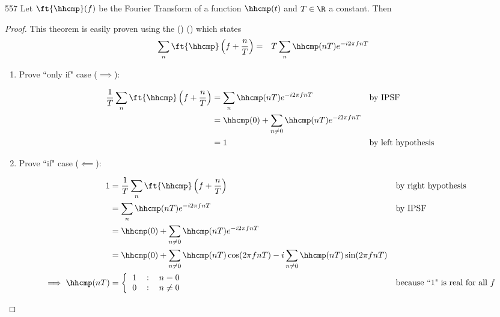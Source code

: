 \begin{theorem}
\citep{proakis}{557}
\label{thm:unity}
Let $\ft{\hhcmp}(f)$ be the Fourier Transform of a function
$\hhcmp(t)$ and $T\in\R$ a constant.
Then
\formbox{
  \left[
  \hhcmp(nT) =
  \left\{
     \begin{tabular}{lcl}
        1 & : & $n=0$ \\
        0 & : & $n\neq 0$
     \end{tabular}
  \right.
  \right]
  \qquad\iff\qquad
  \left[
    \frac{1}{T}\sum_n \ft{\hhcmp}\left(f+ \frac{n}{T} \right) = 1.
  \right]
  }
\end{theorem}
\begin{proof}
This theorem is easily proven using the
 ()
()
which states
\begin{eqnarray*}
   \sum_n \ft{\hhcmp}\left( f+ \frac{n}{T} \right)
       &=& T
           \sum_n \hhcmp(nT)
           e^{-i2\pi fnT}
\end{eqnarray*}

\begin{enumerate}
\item Prove ``only if" case ($\implies$):

\begin{align*}
  \frac{1}{T}\sum_n \ft{\hhcmp}\left( f + \frac{n}{T} \right)
     &= \sum_n \hhcmp(nT) e^{-i2\pi fnT}
     && \text{by IPSF}
   \\&= \hhcmp(0) + \sum_{n\ne0} \hhcmp(nT) e^{-i2\pi fnT}
   \\&= 1
     && \text{by left hypothesis}
\end{align*}


\item Prove ``if" case ($\impliedby$):

\begin{align*}
   1
     &= \frac{1}{T}\sum_n \ft{\hhcmp}\left( f+\frac{n}{T} \right)
     && \text{by right hypothesis}
   \\&= \sum_n \hhcmp(nT) e^{-i2\pi fnT}
     && \text{by IPSF}
   \\&= \hhcmp(0) + \sum_{n\ne 0} \hhcmp(nT) e^{-i2\pi fnT}
   \\&= \hhcmp(0) + \sum_{n\ne 0} \hhcmp(nT) \cos(2\pi fnT)
                     - i\sum_{n\ne 0} \hhcmp(nT) \sin(2\pi fnT)
   \\ \implies
   \hhcmp(nT)
       &= \left\{
        \begin{tabular}{lcl}
           1 & : & $n=0$    \\
           0 & : & $n\neq0$
        \end{tabular}
        \right.
       && \text{because ``1" is real for all $f$}
\end{align*}
\end{enumerate}
\end{proof}

